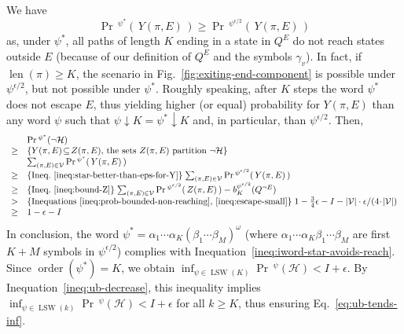 \documentclass[final,3p,times,twocolumn]{elsarticle}
\theoremstyle{plain}
\theoremstyle{definition}
\newcommand{\smbol}{\alpha}
\newcommand{\smbolp}{\beta}
\newcommand{\fpath}{\pi}
\newcommand{\infimum}{I}
\newcommand{\phit}{\mathcal{H}}
\newcommand{\pnhit}{\lnot\mathcal{H}}
\DeclareMathOperator{\lenWord}{len}
\newcommand{\len}[1]{\lenWord({#1})}
\newcommand{\iword}{\psi}
\DeclareMathOperator{\prWord}{Pr}
\newcommand{\recallEquation}[1]{Eq.~\ref{#1}}
\newcommand{\wprefix}[2]{\text{${#1}\!\!\downarrow\!\!{#2}$}}
\newcommand{\recallInequation}[1]{Inequation~\ref{#1}}
\newcommand{\iwordeps}{\iword^{\epsilon/2}}
\newcommand{\recallFigure}[1]{Fig.~\ref{#1}}
\newcommand{\belief}[3]{b^{#1}_{#2}({#3})}
\newcommand{\card}[1]{|{#1}|}
\DeclareMathOperator{\orderWord}{order}
\newcommand{\order}[1]{\orderWord(#1)}
\DeclareMathOperator{\lswWord}{LSW}
\newcommand{\alllsw}[1]{\lswWord({#1})}
\newcommand{\explanation}[1]{$\{$\mbox{#1}$\}$}
\newcommand{\pr}{\prWord\,\!}
\begin{document}
We have
\begin{equation}
\label{ineq:star-better-than-eps-for-Y}
 \pr^{\iword^{*}}(\, Y(\fpath,E) \,) \geq \pr^{\iwordeps}( \, Y(\fpath,E) \,)
\end{equation}
as, under $\iword^{*}$, all paths of length $K$ ending in a state in
$Q^{E}$ do not reach states outside $E$ (because of our definition of $Q^{E}$
and the symbols $\gamma_{v}$). In fact, if $\len{\fpath} \geq K$, the
scenario in \recallFigure{fig:exiting-end-component} is possible under
$\iwordeps$, but not possible under $\iword^{*}$. Roughly speaking, after $K$
steps the word $\iword^{*}$ does not escape $E$, thus yielding higher
(or equal) probability for $Y(\fpath, E)$ than any word $\iword$ such that
$\wprefix{\iword}{K} = \wprefix{\iword^{*}}{K}$ and, in particular, than
$\iwordeps$. Then,
\[
\begin{array}{cl}
& \pr^{\iword^{*}}(\pnhit) \\
\geq & \explanation{$Y(\fpath,E)\!\subseteq\!Z(\fpath,E)$,
						the sets $Z(\fpath,E)$ partition $\pnhit$} \\
     & \sum_{(\fpath,E) \in \mathcal{V}} \pr^{\iword^{*}}(\, Y(\fpath,E) \,) \\
\geq & \explanation{Ineq.~\ref{ineq:star-better-than-eps-for-Y}} \;
     	\sum_{(\fpath,E) \in \mathcal{V}} \pr^{\iwordeps}(\, Y(\fpath,E) \,) \\
\geq & \explanation{Ineq.~\ref{ineq:bound-Z}} \;
		\sum_{(\fpath,E) \in \mathcal{V}}
			\pr^{\iwordeps}(\, Z(\fpath,E) \,)
			- \belief{\iwordeps}{K}{Q^{\lnot E}} \\
> & \explanation{Inequations~\ref{ineq:prob-bounded-non-reaching},
								\ref{ineq:escape-small}} \;
  	1 - \frac{3}{4}\epsilon - \infimum - \card{\mathcal{V}} \cdot
								\epsilon/(4\!\cdot\!\card{\mathcal{V}}) \\
\geq & 1 - \epsilon - \infimum
\end{array}
\]
In conclusion, the word
$\iword^{*}
	= \smbol_{1} \cdots \smbol_{K} (\smbolp_{1} \cdots \smbolp_{M})^{\omega}$
(where $\smbol_{1} \cdots \smbol_{K} \smbolp_{1} \cdots \smbolp_{M}$ are first
$K+M$ symbols in $\iwordeps$) complies with
\recallInequation{ineq:iword-star-avoids-reach}. Since
$\order{\iword^{*}} = K$, we obtain
$\inf_{\iword \in \alllsw{K}} \pr^{\iword}(\phit) < \infimum + \epsilon$. By
\recallInequation{ineq:ub-decrease}, this inequality implies
$\inf_{\iword \in \alllsw{k}} \pr^{\iword}(\phit) < \infimum + \epsilon$
for all $k \geq K$, thus ensuring \recallEquation{eq:ub-tends-inf}.
\end{document}
